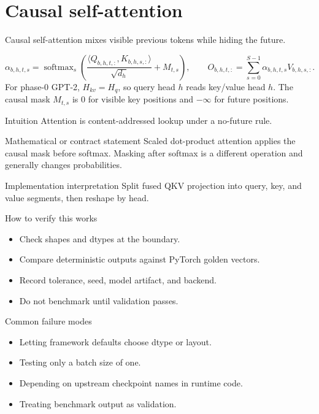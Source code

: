 \chapter{Causal self-attention}
\label{ch:causal-self-attention}
Causal self-attention mixes visible previous tokens while hiding the future.

\[
\alpha_{b,h,t,s}
=
\operatorname{softmax}_{s}\left(
\frac{\langle Q_{b,h,t,:},K_{b,h,s,:}\rangle}{\sqrt{d_h}}
+M_{t,s}
\right),
\qquad
O_{b,h,t,:}=\sum_{s=0}^{S-1}\alpha_{b,h,t,s}V_{b,h,s,:}.
\]
For phase-0 GPT-2, \(H_{kv}=H_q\), so query head \(h\) reads key/value head \(h\). The causal mask \(M_{t,s}\) is \(0\) for visible key positions and \(-\infty\) for future positions.

\begin{intuitionbox}{Intuition}
Attention is content-addressed lookup under a no-future rule.
\end{intuitionbox}

\begin{definitionbox}{Mathematical or contract statement}
Scaled dot-product attention applies the causal mask before softmax. Masking after softmax is a different operation and generally changes probabilities.
\end{definitionbox}

\begin{implementationbox}{Implementation interpretation}
Split fused QKV projection into query, key, and value segments, then reshape by head.
\end{implementationbox}

\begin{verificationbox}{How to verify this works}
\begin{itemize}
\item Check shapes and dtypes at the boundary.
\item Compare deterministic outputs against PyTorch golden vectors.
\item Record tolerance, seed, model artifact, and backend.
\item Do not benchmark until validation passes.
\end{itemize}
\end{verificationbox}

\begin{warningbox}{Common failure modes}
\begin{itemize}
\item Letting framework defaults choose dtype or layout.
\item Testing only a batch size of one.
\item Depending on upstream checkpoint names in runtime code.
\item Treating benchmark output as validation.
\end{itemize}
\end{warningbox}

